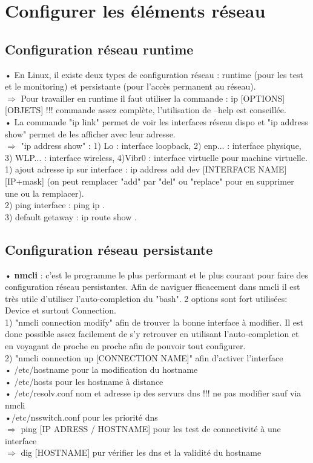 \documentclass[a4paper, 11pt, french, oneside]{book}
\begin{document}
	\chapter{Configurer les éléments réseau}
		\section{Configuration réseau runtime}
			• En Linux, il existe deux types de configuration réseau : runtime (pour les test et le monitoring) et persistante (pour l'accès permanent au réseau).\\
			$\Rightarrow$ Pour travailler en runtime il faut utiliser la commande : ip [OPTIONS][OBJETS] !!! commande assez complète, l'utilisation de --help est conseillée. \\
			• La commande "ip link" permet de voir les interfaces réseau dispo et "ip address show" permet de les afficher avec leur adresse.\\
			$\Rightarrow$ "ip address show" : 1) Lo : interface  loopback, 2) enp... : interface physique, 3) WLP... : interface wireless, 4)Vibr0 : interface virtuelle pour machine virtuelle. \\
		  	1) ajout adresse ip sur interface : ip address add dev [INTERFACE NAME] [IP+mask] (on peut remplacer "add" par "del" ou "replace" pour en supprimer une ou la remplacer).\\
		 	2) ping interface : ping ip .\\
		 	3) default getaway : ip route show .\\
		\section{Configuration réseau persistante}
			• \textbf{nmcli}  : c'est le programme le plus performant et le plus courant pour faire des configuration réseau persistantes. Afin de naviguer fficacement dans nmcli il est très utile d'utiliser l'auto-completion du "bash". 2 options sont fort utilisées: Device et surtout Connection. \\
			1) "nmcli connection modify" afin de trouver la bonne interface à modifier. Il est donc possible assez facilement de s'y retrouver en utilisant l'auto-completion et en voyagant de proche en proche afin de pouvoir tout configurer.\\
			2) "nmcli connection up [CONNECTION NAME]" afin d'activer l'interface\\
			• /etc/hostname pour la modification du hostname \\
		    • /etc/hosts pour les hostname à distance\\
		    • /etc/resolv.conf nom et adresse ip des servurs dns !!! ne pas modifier sauf via nmcli\\
		    •/etc/nsswitch.conf pour les priorité dns\\ 
			$\Rightarrow$ ping [IP ADRESS / HOSTNAME] pour les test de connectivité à une interface \\
			$\Rightarrow$  dig [HOSTNAME] pur vérifier les dns et la validité du hostname\\
\end{document}
